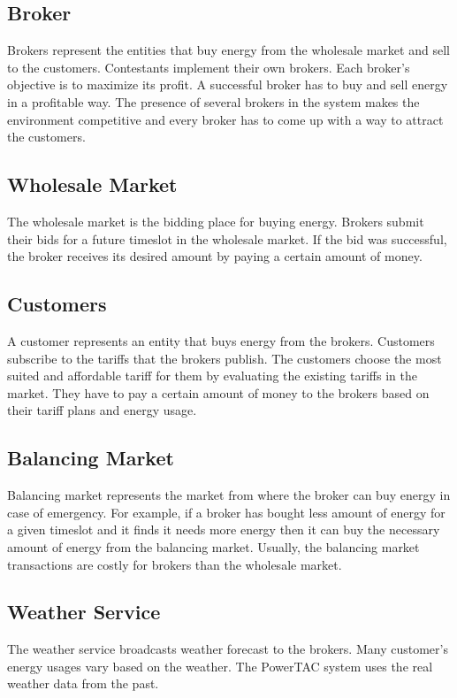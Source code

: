 \subsection{Broker}
Brokers represent the entities that buy energy from the wholesale market and sell to the customers. Contestants implement their own brokers. Each broker's objective is to maximize its profit. A successful broker has to buy and sell energy in a profitable way. The presence of several brokers in the system makes the environment competitive and every broker has to come up with a way to attract the customers.

\subsection{Wholesale Market}
The wholesale market is the bidding place for buying energy. Brokers submit their bids for a future timeslot in the wholesale market. If the bid was successful, the broker receives its desired amount by paying a certain amount of money. 

\subsection{Customers}
A customer represents an entity that buys energy from the brokers. Customers subscribe to the tariffs that the brokers publish. The customers choose the most suited and affordable tariff for them by evaluating the existing tariffs in the market. They have to pay a certain amount of money to the brokers based on their tariff plans and energy usage.

\subsection{Balancing Market}
Balancing market represents the market from where the broker can buy energy in case of emergency. For example, if a broker has bought less amount of energy for a given timeslot and it finds it needs more energy then it can buy the necessary amount of energy from the balancing market. Usually, the balancing market transactions are costly for brokers than the wholesale market.

\subsection{Weather Service}
The weather service broadcasts weather forecast to the brokers. Many customer's energy usages vary based on the weather. The PowerTAC system uses the real weather data from the past.

